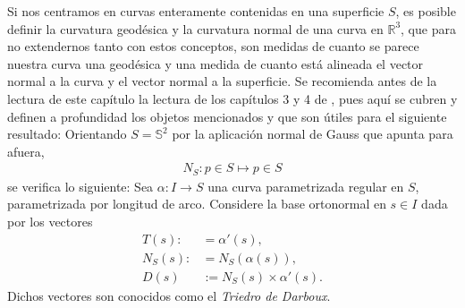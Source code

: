 \documentclass[oneside,11pt]{memoir}
\begin{document}
Si nos centramos en curvas enteramente contenidas en una superficie $S$, es posible definir la curvatura geodésica y la curvatura normal de una curva en $\mathbb{R}^3$, que para no extendernos tanto con estos conceptos, son medidas de cuanto se parece nuestra curva una geodésica y una medida de cuanto está alineada el vector normal a la curva y el vector normal a la superficie. Se recomienda antes de la lectura de este capítulo la lectura de los capítulos 3 y 4 de \cite{do2016differential}, pues aquí se cubren y definen a profundidad los objetos mencionados y que son útiles para el siguiente resultado: Orientando $S=\mathbb{S}^2$ por la aplicación normal de Gauss que apunta para afuera,
\begin{align*}
    N_S:p\in S\mapsto p\in S
\end{align*}
se verifica lo siguiente: Sea $\alpha : I \to S$ una curva parametrizada regular en $S$, parametrizada por longitud de arco. Considere la base ortonormal en $s\in I$ dada por los vectores
\begin{align*}
    T(s):&=\alpha'(s),\\
    N_S(s):&=N_S(\alpha(s)),\\
   D(s)&:=N_S(s)\times \alpha'(s).
\end{align*}
Dichos vectores son conocidos como el \textit{Triedro de Darboux}. 
\end{document}
